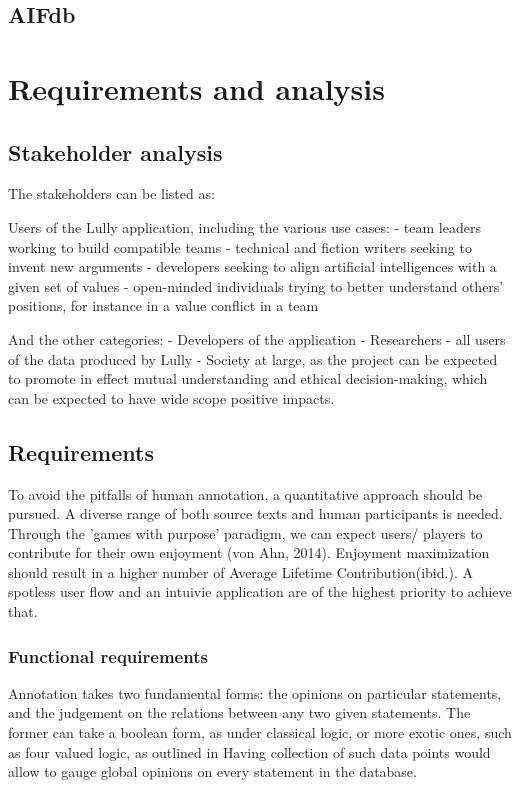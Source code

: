 \documentclass{article}
\begin{document}
\section{AIFdb}

\chapter{Requirements and analysis}

\section{Stakeholder analysis}
The stakeholders can be listed as:

Users of the Lully application, including the various use cases:
- team leaders working to build compatible teams
- technical and fiction writers seeking to invent new arguments
- developers seeking to align artificial intelligences with a given set of values 
- open-minded individuals trying to better understand others' positions, for instance in a value conflict in a team

And the other categories:
- Developers of the application 
- Researchers - all users of the data produced by Lully
- Society at large, as the project can be expected to promote in effect mutual understanding and ethical decision-making, which can be expected to have wide scope positive impacts.

\section{Requirements}
To avoid the pitfalls of human annotation, a quantitative approach should be pursued. A diverse range of both source texts and human participants is needed. Through the 'games with purpose' paradigm, we can expect users/ players to contribute for their own enjoyment (von Ahn, 2014). Enjoyment maximization should result in a higher number of Average Lifetime Contribution(ibid.).  A spotless user flow and an intuivie application are of the highest priority to achieve that.


\subsection{Functional requirements}

Annotation takes two fundamental forms: the opinions on particular statements, and the judgement on the relations between any two given statements.
The former can  take a boolean form, as under classical logic, or more exotic ones, such as four valued logic, as outlined in  \cite{Priest2008}
Having collection of such data points would allow to gauge global opinions on every statement in the database.
\end{document}
